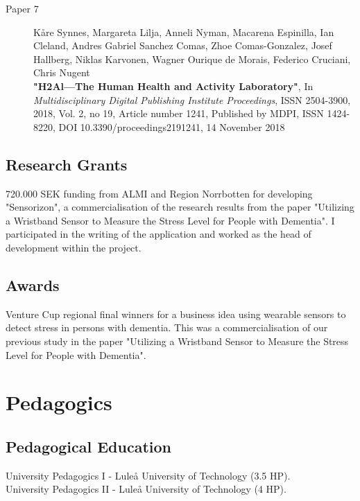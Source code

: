 \documentclass{article}
\begin{document}
\begin{description}
\item[Paper 7]
Kåre Synnes, Margareta Lilja, Anneli Nyman, Macarena Espinilla, Ian Cleland, Andres Gabriel Sanchez Comas, Zhoe Comas-Gonzalez, Josef Hallberg, Niklas Karvonen, Wagner Ourique de Morais, Federico Cruciani, Chris Nugent\\
{\bf "H2Al—The Human Health and Activity Laboratory"}, 
In {\it Multidisciplinary Digital Publishing Institute Proceedings}, ISSN 2504-3900, 2018, Vol. 2, no 19, Article number 1241,
Published by MDPI, ISSN 1424-8220,
DOI 10.3390/proceedings2191241,
14 November 2018
\end{description}

\subsection{Research Grants}
720.000 SEK funding from ALMI and Region Norrbotten for developing "Sensorizon", a commercialisation of the research results from the paper "Utilizing a Wristband Sensor to Measure the Stress Level for People with Dementia". I participated in the writing of the application and worked as the head of development within the project.



\subsection{Awards}
Venture Cup regional final winners for a business idea using wearable sensors to detect stress in persons with dementia. This was a commercialisation of our previous study in the paper "Utilizing a Wristband Sensor to Measure the Stress Level for People with Dementia".

\newpage


\section{Pedagogics}
\subsection{Pedagogical Education}
University Pedagogics I - Luleå University of Technology (3.5 HP).\\
University Pedagogics II - Luleå University of Technology (4 HP).
\end{document}
